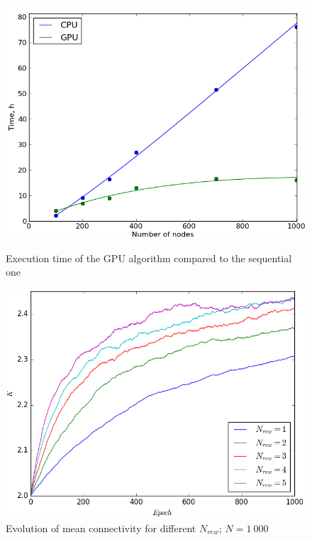 \documentclass[procedia]{easychair}
\begin{document}
	\begin{figure}[ht!]
		\begin{minipage}[t]{0.45\textwidth}
			\includegraphics[width=1.0\textwidth]{plots/speedup}
			\caption{Execution time of the GPU algorithm compared to the sequential one}
			\label{fig:speedup}
		\end{minipage}\hfill
		\begin{minipage}[t]{0.45\textwidth}
			\includegraphics[width=1.0\textwidth]{plots/n_rew}
			\caption{Evolution of mean connectivity for different $N_{rew}$; $N=1~000$}
			\label{fig:nrew}
		\end{minipage}
	\end{figure}
	
\end{document}
